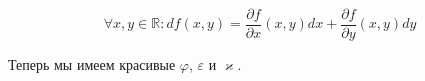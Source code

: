 \documentclass[a4paper, 12pt]{article}
\newcommand{\deriv}[2]{\frac{\partial #1}{\partial #2}} %
\newcommand{\R}{\mathbb R} %
\renewcommand{\phi}{\varphi} %
\renewcommand{\epsilon}{\varepsilon} %
\renewcommand{\kappa}{\varkappa} %
\begin{document}
    \[\forall x, y \in \R : df(x, y) = \deriv{f}{x}(x, y)dx + \deriv{f}{y}(x, y)dy\]

    Теперь мы имеем красивые $\phi$, $\epsilon$ и $\kappa$.
\end{document}
